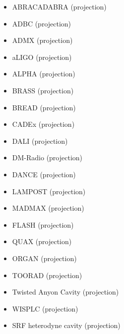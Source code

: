 \documentclass[8pt,twocolumn]{extarticle}
\begin{document}
\begin{mdframed}[everyline=true]
\begin{itemize}
    \item ABRACADABRA (projection)~\cite{ABRACADABRA}
	\item ADBC (projection)~\cite{Liu:2018icu} 
	\item ADMX (projection)~\cite{Stern:2016bbw}
              \item aLIGO (projection)~\cite{Nagano:2019rbw} 
           \item ALPHA (projection)~\cite{Lawson:2019brd,Millar:2022peq} 
           \item BRASS (projection)~\cite{BRASS}
           \item BREAD (projection)~\cite{Liu:2021pei}
           \item CADEx (projection)~\cite{Aja:2022csb}
           \item DALI (projection)~\cite{DeMiguel:2023nmz}
    \item DM-Radio (projection)~\cite{DMRadio,DMRadio:2022pkf}
     \item DANCE (projection)~\cite{Michimura:2019qxr} 
           \item LAMPOST (projection)~\cite{Baryakhtar:2018doz} 
      \item MADMAX (projection)~\cite{Beurthey:2020yuq} 
           \item FLASH (projection)~\cite{Alesini:2017ifp,FLASH} 
           \item QUAX (projection)~\cite{QUAX} 
                 \item ORGAN (projection)~\cite{McAllister:2017lkb} 
                       \item TOORAD (projection)~\cite{Schutte-Engel:2021bqm} 
                       \item Twisted Anyon Cavity (projection)~\cite{Bourhill:2022alm}
                       \item WISPLC (projection)~\cite{Zhang:2021bpa} 
                       \item SRF heterodyne cavity (projection)~\cite{Berlin:2020vrk}

\end{itemize}
\vspace{-2.5em}

\end{mdframed}
\end{document}
